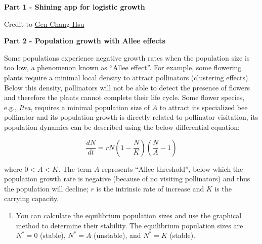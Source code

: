 \documentclass[
]{book}
\providecommand{\tightlist}{%
  \setlength{\itemsep}{0pt}\setlength{\parskip}{0pt}}
\begin{document}
\textbf{Part 1 - Shining app for logistic growth}

Credit to \href{https://genchanghsu.github.io/index.html}{Gen-Chang Hsu}

\textbf{Part 2 - Population growth with Allee effects}

Some populations experience negative growth rates when the population size is too low, a phenomenon known as ``Allee effect''. For example, some flowering plants require a minimal local density to attract pollinators (clustering effects). Below this density, pollinators will not be able to detect the presence of flowers and therefore the plants cannot complete their life cycle. Some flower species, e.g., \emph{Itea}, requires a minimal population size of \(A\) to attract its specialized bee pollinator and its population growth is directly related to pollinator visitation, its population dynamics can be described using the below differential equation:

\[
\frac{dN}{dt} = rN(1-\frac{N}{K})(\frac{N}{A}-1)
\]

where \(0 < A < K\). The term \(A\) represents ``Allee threshold'', below which the population growth rate is negative (because of no visiting pollinators) and thus the population will decline; \(r\) is the intrinsic rate of increase and \(K\) is the carrying capacity.

\begin{enumerate}
\def\labelenumi{(\arabic{enumi})}
\tightlist
\item
  You can calculate the equilibrium population sizes and use the graphical method to determine their stability. The equilibrium population sizes are \(N^* = 0\) (stable), \(N^* = A\) (unstable), and \(N^* = K\) (stable).
\end{enumerate}
\end{document}
